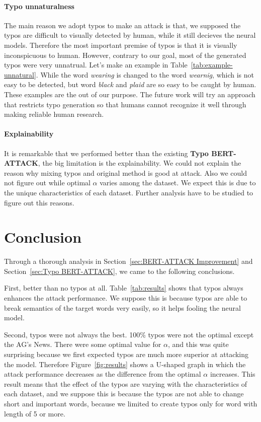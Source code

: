 \documentclass[11pt,a4paper]{article}
\begin{document}
\paragraph{Typo unnaturalness} The main reason we adopt typos to make an attack is that, we supposed the typos are difficult to visually detected by human, while it still decieves the neural models. Therefore the most important premise of typos is that it is visually inconspicuous to human. However, contrary to our goal, most of the generated typos were very unnatrual. Let's make an example in Table~\ref{tab:example-unnatural}. While the word \textit{wearing} is changed to the word \textit{wearnig}, which is not easy to be detected, but word \textit{black} and \textit{plaid} are so easy to be caught by human. These examples are the out of our purpose. The future work will try an approach that restricts typo generation so that humans cannot recognize it well through making reliable human research.
\paragraph{Explainability} It is remarkable that we performed better than the existing \textbf{Typo BERT-ATTACK}, the big limitation is the explainability. We could not explain the reason why mixing typos and original method is good at attack. Also we could not figure out while optimal $\alpha$ varies among the dataset. We expect this is due to the unique characteristics of each dataset. Further analysis have to be studied to figure out this reasons.


\section{Conclusion}
Through a thorough analysis in Section~\ref{sec:BERT-ATTACK Improvement} and Section~\ref{sec:Typo BERT-ATTACK}, we came to the following conclusions.

First, better than no typos at all. Table~\ref{tab:results} shows that typos always enhances the attack performance. We suppose this is because typos are able to break semantics of the target words very easily, so it helps fooling the neural model. 

Second, typos were not always the best. 100\% typos were not the optimal except the AG's News. There were some optimal value for $\alpha$, and this was quite surprising because we first expected typos are much more superior at attacking the model. Therefore Figure~\ref{fig:results} shows a U-shaped graph in which the attack performance decreases as the difference from the optimal $\alpha$ increases. This result means that the effect of the typos are varying with the characteristics of each dataset, and we suppose this is because the typos are not able to change short and important words, because we limited to create typos only for word with length of 5 or more. 
\end{document}
